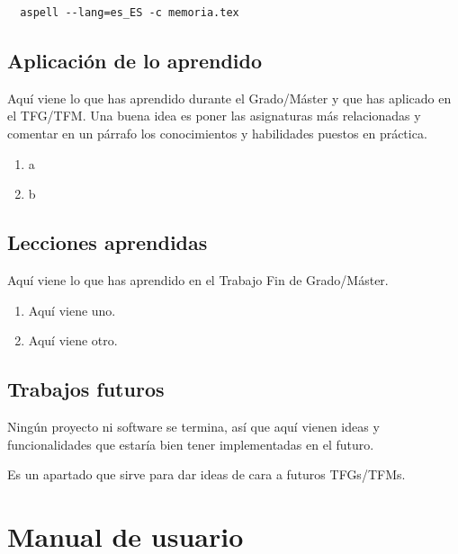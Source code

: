 \documentclass[a4paper, 12pt]{book}
\begin{document}
\begin{verbatim}
  aspell --lang=es_ES -c memoria.tex
\end{verbatim}

\section{Aplicación de lo aprendido}
\label{sec:aplicacion}

Aquí viene lo que has aprendido durante el Grado/Máster y que has aplicado en el TFG/TFM.
Una buena idea es poner las asignaturas más relacionadas y comentar en un párrafo los conocimientos y habilidades puestos en práctica.

\begin{enumerate}
  \item a
  \item b
\end{enumerate}


\section{Lecciones aprendidas}
\label{sec:lecciones_aprendidas}

Aquí viene lo que has aprendido en el Trabajo Fin de Grado/Máster.

\begin{enumerate}
  \item Aquí viene uno.
  \item Aquí viene otro.
\end{enumerate}


\section{Trabajos futuros}
\label{sec:trabajos_futuros}

Ningún proyecto ni software se termina, así que aquí vienen ideas y funcionalidades que estaría bien tener implementadas en el futuro.

Es un apartado que sirve para dar ideas de cara a futuros TFGs/TFMs.



\cleardoublepage
\appendix
\chapter{Manual de usuario}
\label{app:manual}
\end{document}
